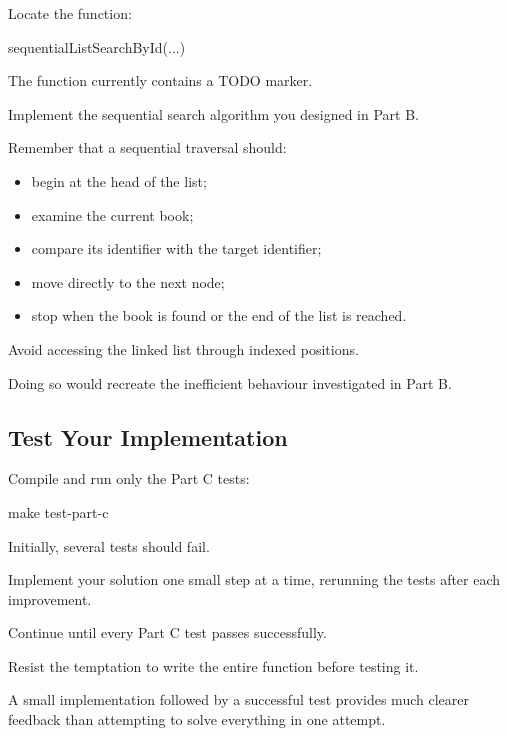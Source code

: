 \documentclass{csc2059practical}
\begin{document}
Locate the function:

\begin{terminal}
sequentialListSearchById(...)
\end{terminal}

The function currently contains a TODO marker.

Implement the sequential search algorithm you designed in Part B.

Remember that a sequential traversal should:

\begin{itemize}
    \item begin at the head of the list;
    \item examine the current book;
    \item compare its identifier with the target identifier;
    \item move directly to the next node;
    \item stop when the book is found or the end of the list is reached.
\end{itemize}

Avoid accessing the linked list through indexed positions.

Doing so would recreate the inefficient behaviour investigated in Part B.


\subsection{Test Your Implementation}

Compile and run only the Part C tests:

\begin{terminal}
make test-part-c
\end{terminal}

Initially, several tests should fail.

Implement your solution one small step at a time, rerunning the tests after
each improvement.

Continue until every Part C test passes successfully.

\begin{tipbox}
Resist the temptation to write the entire function before testing it.

A small implementation followed by a successful test provides much clearer
feedback than attempting to solve everything in one attempt.
\end{tipbox}
\end{document}
